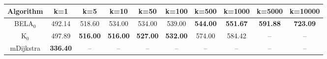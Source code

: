 \begin{tabular}{c|ccccccccc}\toprule
Algorithm & k=1 & k=5 & k=10 & k=50 & k=100 & k=500 & k=1000 & k=5000 & k=10000 \\ \midrule
BELA$_0$ & 492.14 & 518.60 & 534.00 & 534.00 & 539.00 & \textbf{544.00} & \textbf{551.67} & \textbf{591.88} & \textbf{723.09} \\
K$_0$ & 497.89 & \textbf{516.00} & \textbf{516.00} & \textbf{527.00} & \textbf{532.00} & 574.00 & 584.42 & -- & -- \\
mDijkstra & \textbf{336.40} & -- & -- & -- & -- & -- & -- & -- & -- \\ \bottomrule 
\end{tabular}
